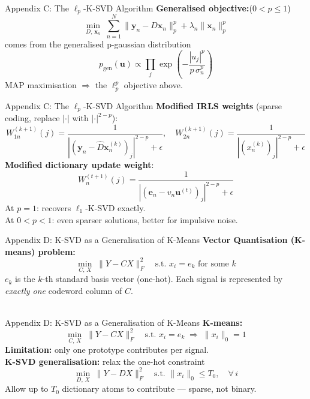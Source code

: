 \documentclass{beamer}
\begin{document}
\begin{frame}{Appendix C: The $\ell_p$-K-SVD Algorithm}
\textbf{Generalised objective:}($0<p\leq 1$)
\[
\min_{D,\,\mathbf{x}_n}\;\sum_{n=1}^{N}\|\mathbf{y}_n-D\mathbf{x}_n\|_p^p+\lambda_n\|\mathbf{x}_n\|_p^p
\]
comes from the generalised p-gaussian distribution 
\[
p_{\mathrm{gen}}(\mathbf{u})\propto\prod_{j}\exp\!\left(-\frac{|u_j|^p}{p\,\sigma_n^p}\right)
\]
MAP maximisation $\Rightarrow$ the $\ell_p^p$ objective above.\\[0.4em]
\end{frame}

\begin{frame}{Appendix C: The $\ell_p$-K-SVD Algorithm}
\textbf{Modified IRLS weights} (sparse coding, replace $|\cdot|$ with $|\cdot|^{2-p}$):
\[
W_{1n}^{(k+1)}(j)=\frac{1}{\left|(\mathbf{y}_n-\hat{D}\mathbf{x}_n^{(k)})_j\right|^{2-p}+\epsilon},
\quad
W_{2n}^{(k+1)}(j)=\frac{1}{\left|(x_n^{(k)})_j\right|^{2-p}+\epsilon}
\]
\textbf{Modified dictionary update weight}:
\[
W_n^{(t+1)}(j)=\frac{1}{\left|(\mathbf{e}_n-v_n\mathbf{u}^{(t)})_j\right|^{2-p}+\epsilon}
\]
At $p=1$: recovers $\ell_1$-K-SVD exactly.\\
At $0<p<1$: even sparser solutions, better for impulsive noise.
\end{frame}


\begin{frame}{Appendix D: K-SVD as a Generalisation of K-Means}
\textbf{Vector Quantisation (K-means) problem:}
\[
\min_{C,\,X}\;\|Y-CX\|_F^2
\quad\text{s.t. } x_i = e_k \text{ for some } k
\]
$e_k$ is the $k$-th standard basis vector (one-hot). Each signal is represented by \emph{exactly one} codeword column of $C$.\\[0.5em]
\\[0.3em]
\phantom{Signals with complex structure cannot be well represented.}
\end{frame}

\begin{frame}{Appendix D: K-SVD as a Generalisation of K-Means}
\textbf{K-means:}
\[
\min_{C,\,X}\;\|Y-CX\|_F^2
\quad\text{s.t. } x_i = e_k \;\Rightarrow\; \|x_i\|_0 = 1
\]
\textbf{Limitation:} only one prototype contributes per signal.\\[0.5em]
\textbf{K-SVD generalisation:} relax the one-hot constraint
\[
\min_{D,\,X}\;\|Y-DX\|_F^2
\quad\text{s.t. }\|x_i\|_0\leq T_0,\quad\forall\,i
\]
Allow up to $T_0$ dictionary atoms to contribute — sparse, not binary.\\[0.3em]
\phantom{Both algorithms share the same alternating structure: sparse coding then dictionary update.}
\end{frame}
\end{document}
